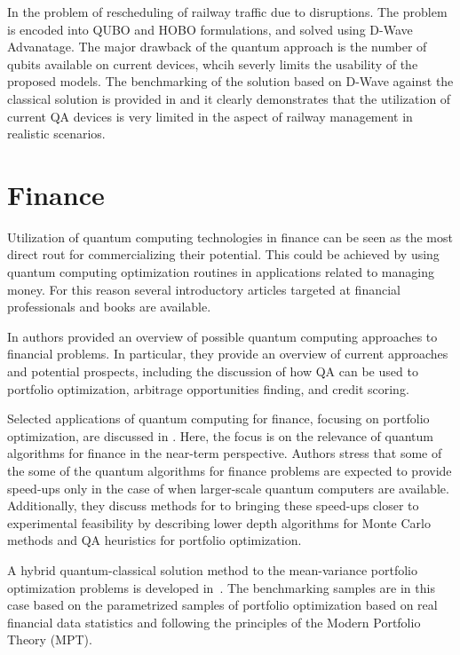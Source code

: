 \documentclass[a4paper,11pt]{article}
\begin{document}
In \cite{domino2022quadratic} the problem of rescheduling of railway traffic due to disruptions. The problem is encoded into QUBO and HOBO formulations, and solved using D-Wave Advanatage. The major drawback of the quantum approach is the number of qubits available on current devices, whcih severly limits the usability of the proposed models. The benchmarking of the solution based on D-Wave against the classical solution is provided in \cite{domino2023quantum} and it clearly demonstrates that the utilization of current QA devices is very limited in the aspect of railway management in realistic scenarios. 


\section{Finance}


Utilization of quantum computing technologies in finance can be seen as the most direct rout for commercializing their potential. This could be achieved by using quantum computing optimization routines in applications related to managing money. For this reason several introductory articles targeted at financial professionals and books are available.

In \cite{orus2019quantum} authors provided an overview of possible quantum computing approaches to financial problems. In particular, they provide an overview of current approaches and potential prospects, including the discussion of how QA can be used to portfolio optimization, arbitrage opportunities finding, and credit scoring.

Selected applications of quantum computing for finance, focusing on portfolio optimization, are discussed in \cite{bouland2020prospects}. Here, the focus is on  the relevance of quantum algorithms for finance in the near-term perspective. Authors stress that some of the some of the quantum algorithms for finance problems are expected to provide speed-ups only in the case of when larger-scale quantum computers are available. Additionally, they discuss methods for to bringing these speed-ups closer to experimental feasibility by describing lower depth algorithms for Monte Carlo methods and QA heuristics for portfolio optimization.

A hybrid quantum-classical solution method to the mean-variance portfolio optimization problems is developed in~\cite{venturelli2019reverse}. The benchmarking samples are in this case based on the parametrized samples of portfolio optimization based on real financial data statistics and following the principles of the Modern Portfolio Theory (MPT).
\end{document}
